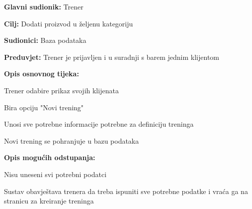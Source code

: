 				\noindent {}
				\begin{packed_item}
					
					\item \textbf{Glavni sudionik:} Trener
					\item  \textbf{Cilj:} Dodati proizvod u željenu kategoriju
					\item  \textbf{Sudionici:} Baza podataka
					\item  \textbf{Preduvjet:} Trener je prijavljen i u suradnji s barem jednim klijentom
					\item  \textbf{Opis osnovnog tijeka:}
					
					\item[] \begin{packed_enum}
						
						\item Trener odabire prikaz svojih klijenata
						\item Bira opciju "Novi trening"
						\item Unosi sve potrebne informacije potrebne za definiciju treninga
						\item Novi trening se pohranjuje u bazu podataka
						
					\end{packed_enum}
				
					\item  \textbf{Opis mogućih odstupanja:}
					
					\item[] \begin{packed_item}
						
						\item[3.a] Nisu uneseni svi potrebni podatci
						\item[] \begin{packed_enum}
							
							\item Sustav obavještava trenera da treba ispuniti sve potrebne podatke i vraća ga na stranicu za kreiranje treninga
						\end{packed_enum}
						
					\end{packed_item}
					
				\end{packed_item}
			
